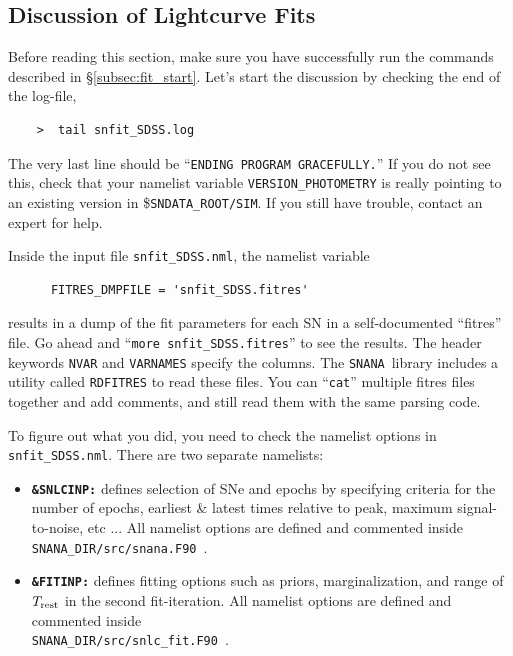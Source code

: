\documentclass[12pt]{article}
\newcommand{\snana}{{\tt SNANA}}
\newcommand{\snanadir}{{\tt SNANA\_DIR}}
\newcommand{\sndataroot}{{\tt SNDATA\_ROOT}}
\begin{document}
   \subsection{Discussion of Lightcurve Fits}
   \label{subsec:fit_discuss}

Before reading this section, make sure you have successfully
run the commands described in \S\ref{subsec:fit_start}.
Let's start the discussion by checking the end of the log-file,
\begin{verbatim}
    >  tail snfit_SDSS.log
\end{verbatim}
%
The very last line should be ``{\tt ENDING PROGRAM GRACEFULLY.}''
If you do not see this, check that your namelist variable
{\tt VERSION\_PHOTOMETRY} is really pointing to an existing
version in \$\sndataroot{\tt /SIM}.
If you still have trouble, contact an expert for help.

Inside the input file {\tt snfit\_SDSS.nml},
the namelist variable
\begin{verbatim}
      FITRES_DMPFILE = 'snfit_SDSS.fitres'
\end{verbatim}
%
results in a dump of the fit parameters for each SN in 
a self-documented ``fitres'' file. Go ahead and
``{\tt more snfit\_SDSS.fitres}'' to see the results.
The header keywords {\tt NVAR} and {\tt VARNAMES} specify
the columns.  The \snana\ library includes a utility
called {\tt RDFITRES} to read these files.
You can ``{\tt cat}'' multiple fitres files together
and add comments,
and still read them with the same parsing code.


To figure out what you did, you need to 
check the namelist options in {\tt snfit\_SDSS.nml}.
There are two separate namelists:
\begin{itemize}
 \item	{\bf \tt \&SNLCINP:} defines selection of SNe and epochs
   	by specifying criteria for the number of epochs, 
	earliest \& latest times relative  to peak, 
	maximum signal-to-noise, etc ... 
   	All namelist options are defined and commented inside
  	\snanadir{\tt /src/snana.F90}~.
%
 \item	{\bf \tt \&FITINP:} defines fitting options such as priors,
     	marginalization, and range of $T_{\rm rest}$ in the second
	fit-iteration.
     	All namelist options are defined and commented inside \\
     	\snanadir{\tt /src/snlc\_fit.F90}~. 
\end{itemize}
\end{document}
